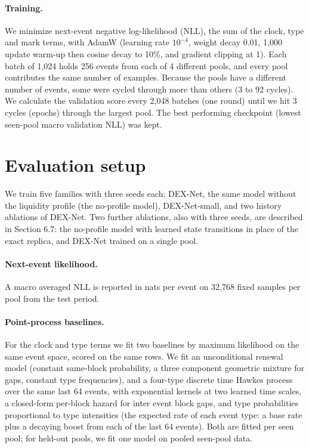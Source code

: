 \documentclass[11pt]{article}
\begin{document}
\paragraph{Training.} We minimize next-event negative log-likelihood (NLL), the sum of the clock, type and mark terms, with AdamW (learning rate $10^{-4}$, weight decay 0.01, 1,000 update warm-up then cosine decay to 10\%, and gradient clipping at 1). Each batch of 1,024 holds 256 events from each of 4 different pools, and every pool contributes the same number of examples. Because the pools have a different number of events, some were cycled through more than others (3 to 92 cycles). We calculate the validation score every 2,048 batches (one round) until we hit 3 cycles (epochs) through the largest pool. The best performing checkpoint (lowest seen-pool macro validation NLL) was kept.

\section{Evaluation setup}

We train five families with three seeds each: DEX-Net, the same model without the liquidity profile (the no-profile model), DEX-Net-small, and two history ablations of DEX-Net. Two further ablations, also with three seeds, are described in Section 6.7: the no-profile model with learned state transitions in place of the exact replica, and DEX-Net trained on a single pool.

\paragraph{Next-event likelihood.} A macro averaged NLL is reported in nats per event on 32,768 fixed samples per pool from the test period.

\paragraph{Point-process baselines.} For the clock and type terms we fit two baselines by maximum likelihood on the same event space, scored on the same rows. We fit an unconditional renewal model (constant same-block probability, a three component geometric mixture for gaps, constant type frequencies), and a four-type discrete time Hawkes process over the same last 64 events, with exponential kernels at two learned time scales, a closed-form per-block hazard for inter event block gaps, and type probabilities proportional to type intensities (the expected rate of each event type: a base rate plus a decaying boost from each of the last 64 events). Both are fitted per seen pool; for held-out pools, we fit one model on pooled seen-pool data.
\end{document}

